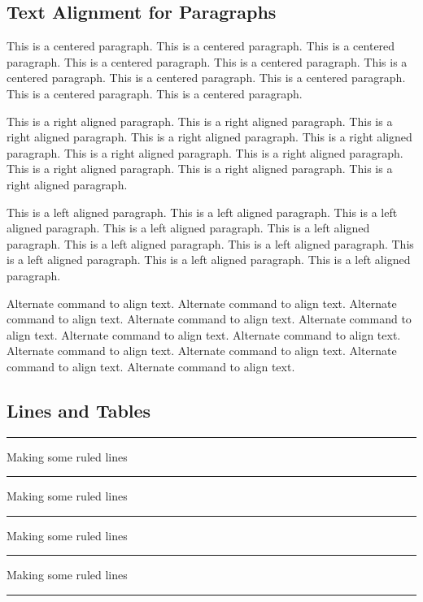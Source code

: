 \documentclass[12pt,twoside,a4paper]{article}
\begin{document}
\newpage

\begin{center}
\subsection*{Text Alignment for Paragraphs}
This is a centered paragraph. This is a centered paragraph. This is a centered paragraph. This is a centered paragraph. This is a centered paragraph. This is a centered paragraph. This is a centered paragraph. This is a centered paragraph. This is a centered paragraph. This is a centered paragraph.
\end{center}

\begin{flushright}
This is a right aligned paragraph. This is a right aligned paragraph. This is a right aligned paragraph. This is a right aligned paragraph. This is a right aligned paragraph. This is a right aligned paragraph. This is a right aligned paragraph. This is a right aligned paragraph. This is a right aligned paragraph. This is a right aligned paragraph.
\end{flushright}

\begin{flushleft}
This is a left aligned paragraph. This is a left aligned paragraph. This is a left aligned paragraph. This is a left aligned paragraph. This is a left aligned paragraph. This is a left aligned paragraph. This is a left aligned paragraph. This is a left aligned paragraph. This is a left aligned paragraph. This is a left aligned paragraph.
\end{flushleft}

\centering
Alternate command to align text. Alternate command to align text. Alternate command to align text. Alternate command to align text. Alternate command to align text. \justify Alternate command to align text. Alternate command to align text. Alternate command to align text. Alternate command to align text. Alternate command to align text. Alternate command to align text.

\newpage
\subsection*{Lines and Tables}

\vspace{40pt}

\hrule height 0.1pt \relax
Making some ruled lines
\hrule height 0.5pt \relax
Making some ruled lines
\hrule height 1pt \relax
Making some ruled lines
\hrule height 3pt \relax
Making some ruled lines
\hrule height 10pt \relax
\end{document}
